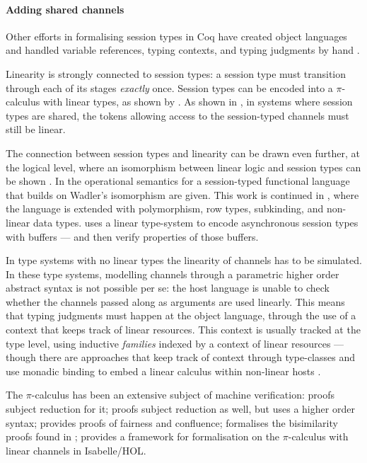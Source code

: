 \documentclass{mproj}
\newcommand{\picalc}{$\pi$-calculus}
\begin{document}
\paragraph{Adding shared channels}
Other efforts in formalising session types in Coq have created object languages and handled variable references, typing contexts, and typing judgments by hand \cite{Dilmore2019}.

Linearity is strongly connected to session types: a session type must transition through each of its stages \emph{exactly} once. Session types can be encoded into a \picalc{} with linear types, as shown by \cite{Kobayashi1996,Dardha2012,Dardha2016}. As shown in \cite{Voinea}, in systems where session types are shared, the tokens allowing access to the session-typed channels must still be linear.

The connection between session types and linearity can be drawn even further, at the logical level, where an isomorphism between linear logic and session types can be shown \cite{Caires2010} \cite{Wadler2014}. In \cite{Lindley2015} the operational semantics for a session-typed functional language that builds on Wadler's isomorphism are given. This work is continued in \cite{Lindley}, where the language is extended with polymorphism, row types, subkinding, and non-linear data types. \cite{Gay2010} uses a linear type-system to encode asynchronous session types with buffers --- and then verify properties of those buffers.

In type systems with no linear types the linearity of channels has to be simulated. In these type systems, modelling channels through a parametric higher order abstract syntax \cite{Chlipala2008} is not possible per se: the host language is unable to check whether the channels passed along as arguments are used linearly. This means that typing judgments must happen at the object language, through the use of a context that keeps track of linear resources.  This context is usually tracked at the type level, using inductive \emph{families} \cite{Dybjer1994} indexed by a context of linear resources \cite{Power2000} --- though there are approaches that keep track of context through type-classes and use monadic binding to embed a linear calculus within non-linear hosts \cite{Paykin2017}.

The \picalc{} has been an extensive subject of machine verification: \cite{Henry-Gerard1999} proofs subject reduction for it; \cite{Despeyroux2000} proofs subject reduction as well, but uses a higher order syntax; \cite{Affeldt2008} provides proofs of fairness and confluence; \cite{Honsell2001} formalises the bisimilarity proofs found in \cite{Walker1989}; \cite{Gay2001} provides a framework for formalisation on the \picalc{} with linear channels in Isabelle/HOL.
\end{document}
